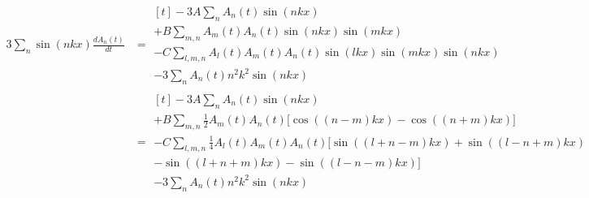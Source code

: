 \documentclass[reqno]{article}
\begin{document}
\begin{equation}
    \begin{split}
        3 \sum_n \sin (n k x) \frac{d A_n(t)}{dt}
        &=
        \begin{multlined}[t]
            - 3 A \sum_n A_n(t) \sin (n k x) \\
            + B \sum_{m, n} A_m(t) A_n(t) \sin (n k x) \sin (m k x) \\
            - C \sum_{l, m, n} A_l(t) A_m(t) A_n(t) \sin (l k x) \sin (m k x) \sin (n k x) \\
            - 3 \sum_n A_n(t) n^2 k^2 \sin (nkx)
        \end{multlined} \\
        &=
        \begin{multlined}[t]
            - 3 A \sum_n A_n(t) \sin (n k x) \\
            + B \sum_{m, n} \tfrac12 A_m(t) A_n(t) \biggl[ \cos((n - m) k x) - \cos((n + m) k x) \biggr]  \\
            - C \sum_{l, m, n} \tfrac14 A_l(t) A_m(t) A_n(t) \biggl[ \sin ((l + n - m) k x) + \sin((l - n + m) k x)  \\
                - \sin((l + n + m) k x) - \sin((l - n - m) k x) \biggr]  \\
            - 3 \sum_n A_n(t) n^2 k^2 \sin (nkx)
        \end{multlined}
    \end{split}
\end{equation}
\end{document}
